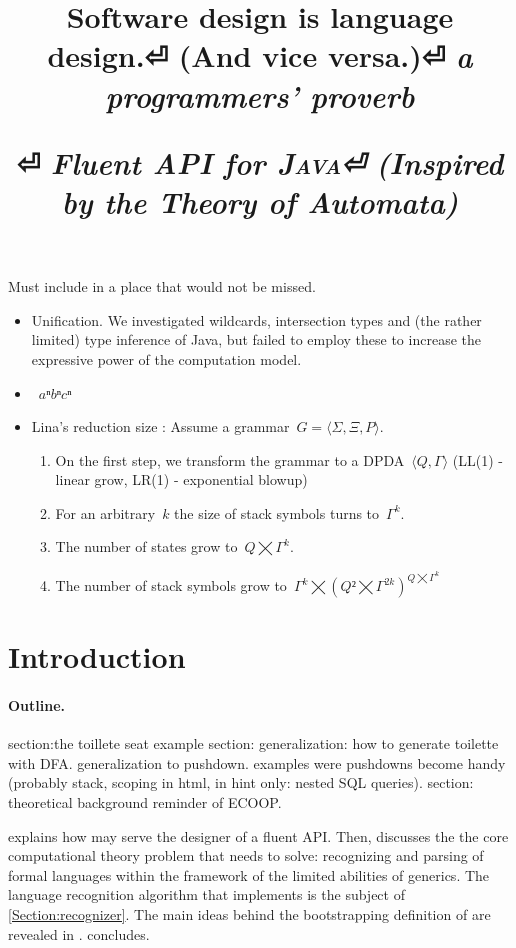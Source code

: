 \documentclass[nonatbib,preprint,numbers]{sigplanconf}
\title{%
\begin{flushright}
  \scriptsize\bfseries
  Software design is language design.⏎
    (And vice versa.)⏎
  \footnotesize\mdseries\itshape
   a programmers' proverb
\end{flushright}
  \Huge \Fajita⏎
  \huge \itshape \textbf Fluent \textbf API for \textsc{\textbf Java}⏎
  \LARGE (\textbf Inspired by the \textbf Theory of \textbf Automata)
}
\begin{document}
\maketitle

\begin{abstract}
  
\end{abstract}

Must include in a place that would not be missed.
\begin{itemize}
  \item \Prolog Unification. We investigated wildcards, intersection types and
        (the rather limited) type inference of Java, but failed to employ these to
        increase the expressive power of the computation model.
        \item~$aⁿbⁿcⁿ$
  \item Lina's reduction size : Assume a grammar~$G=⟨Σ,Ξ, P⟩$.
    \begin{enumerate}
      \item On the first step, we transform the grammar to a DPDA~$⟨Q,Γ⟩$
        (LL(1) - linear grow, LR(1) - exponential blowup)
      \item For an arbitrary~$k$ the size of stack symbols turns to~$Γ^k$.
      \item The number of states grow to~$Q⨉Γ^k$.
      \item The number of stack symbols grow to~$Γ^k⨉(Q²⨉Γ^{2k})^{Q⨉Γ^k}$
    \end{enumerate}

\end{itemize}

\section{Introduction}


\paragraph{Outline.}
section:the toillete seat example
section: generalization:
  how to generate toilette with DFA.
  generalization to pushdown.
  examples were pushdowns become handy (probably stack, scoping in html, in hint only: nested SQL queries).
section: theoretical background
reminder of ECOOP.

  explains how \Fajita may serve the designer of a fluent API.
Then,  discusses the
  the core computational theory problem that \Fajita
  needs to solve: recognizing and parsing of formal languages
  within the framework of the limited abilities of \Java
  generics.
The language recognition algorithm that \Fajita
  implements is the subject of \cref{Section:recognizer}.
The main ideas behind the bootstrapping definition of \Self
  are revealed in .
 concludes.
\end{document}
